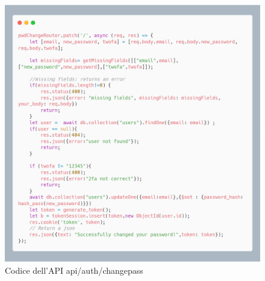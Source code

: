 \documentclass{report}
\begin{document}
\begin{figure}[H]
	\centering\includegraphics[width=1\textwidth]{images/microservizio-autenticazione/changepass-carbon.png}
	Codice dell'API api/auth/changepass
\end{figure}
\end{document}
